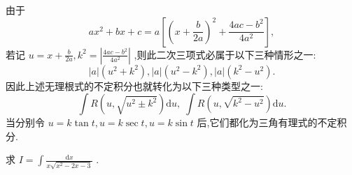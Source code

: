 由于
\[
a{x}^{2} + {bx} + c = a\left\lbrack  {{\left( x + \frac{b}{2a}\right) }^{2} + \frac{{4ac} - {b}^{2}}{4{a}^{2}}}\right\rbrack  ,
\]
若记 \(u = x + \frac{b}{2a},{k}^{2} = \left| \frac{{4ac} - {b}^{2}}{4{a}^{2}}\right|\) ,则此二次三项式必属于以下三种情形之一:
\[
\left| a\right| \left( {{u}^{2} + {k}^{2}}\right) ,\left| a\right| \left( {{u}^{2} - {k}^{2}}\right) ,\left| a\right| \left( {{k}^{2} - {u}^{2}}\right) .
\]
因此上述无理根式的不定积分也就转化为以下三种类型之一:
\[
\int R\left( {u,\sqrt{{u}^{2} \pm  {k}^{2}}}\right) \mathrm{d}u,\;\int R\left( {u,\sqrt{{k}^{2} - {u}^{2}}}\right) \mathrm{d}u.
\]
当分别令 \(u = k\tan t,u = k\sec t,u = k\sin t\) 后,它们都化为三角有理式的不定积分.

\begin{example}

\end{example}
求 \(I = \int \frac{\mathrm{d}x}{x\sqrt{{x}^{2} - {2x} - 3}}\) .

